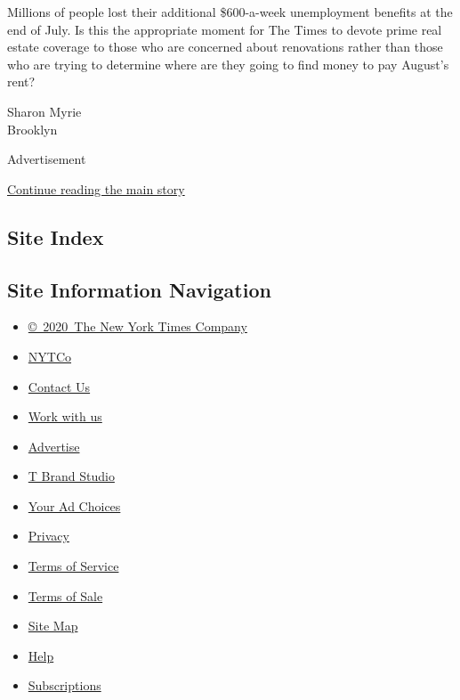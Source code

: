Millions of people lost their additional \$600-a-week unemployment
benefits at the end of July. Is this the appropriate moment for The
Times to devote prime real estate coverage to those who are concerned
about renovations rather than those who are trying to determine where
are they going to find money to pay August's rent?

Sharon Myrie\\
Brooklyn

Advertisement

\protect\hyperlink{after-bottom}{Continue reading the main story}

\hypertarget{site-index}{%
\subsection{Site Index}\label{site-index}}

\hypertarget{site-information-navigation}{%
\subsection{Site Information
Navigation}\label{site-information-navigation}}

\begin{itemize}
\tightlist
\item
  \href{https://help.nytimes.com/hc/en-us/articles/115014792127-Copyright-notice}{©~2020~The
  New York Times Company}
\end{itemize}

\begin{itemize}
\tightlist
\item
  \href{https://www.nytco.com/}{NYTCo}
\item
  \href{https://help.nytimes.com/hc/en-us/articles/115015385887-Contact-Us}{Contact
  Us}
\item
  \href{https://www.nytco.com/careers/}{Work with us}
\item
  \href{https://nytmediakit.com/}{Advertise}
\item
  \href{http://www.tbrandstudio.com/}{T Brand Studio}
\item
  \href{https://www.nytimes.com/privacy/cookie-policy\#how-do-i-manage-trackers}{Your
  Ad Choices}
\item
  \href{https://www.nytimes.com/privacy}{Privacy}
\item
  \href{https://help.nytimes.com/hc/en-us/articles/115014893428-Terms-of-service}{Terms
  of Service}
\item
  \href{https://help.nytimes.com/hc/en-us/articles/115014893968-Terms-of-sale}{Terms
  of Sale}
\item
  \href{https://spiderbites.nytimes.com}{Site Map}
\item
  \href{https://help.nytimes.com/hc/en-us}{Help}
\item
  \href{https://www.nytimes.com/subscription?campaignId=37WXW}{Subscriptions}
\end{itemize}
